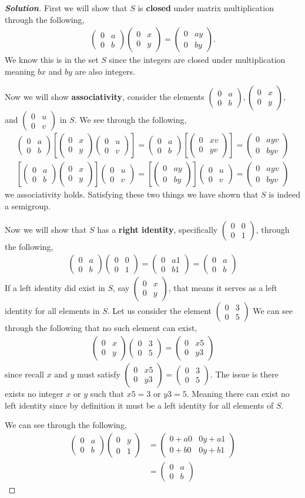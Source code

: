 \documentclass[11pt]{article}
\newenvironment{solution}{\begin{proof}[\textbf{\textit{Solution}}] }{\end{proof}}
\newcommand\m[1]{\begin{pmatrix}#1\end{pmatrix}}
\begin{document}
\begin{solution}
    \newcommand{\pmat}{\m{0 & a \\ 0 & b}}
    \newcommand{\pmats}[2]{\begin{pmatrix}0 & #1 \\ 0 & #2\end{pmatrix}}
    First we will show that $S$ is \textbf{closed} under matrix multiplication through the following,
    \begin{align*}
        \pmat \m{0 & x \\ 0 & y} = \m{0 & ay \\ 0 & by}.
    \end{align*}
    We know this is in the set $S$ since the integers are closed under multiplication meaning $bx$ and $by$ are also integers. 

    Now we will show \textbf{associativity}, consider the elements $\pmats{a}{b}, \pmats{x}{y},$ and $\pmats{u}{v}$ in $S$. We see through the following, 
    \begin{align*}
        \pmats{a}{b} \left[\pmats{x}{y}\pmats{u}{v}\right] = \pmat \left[\pmats{xv}{yv}\right] = \pmats{ayv}{byv} \\
        \left[\pmats{a}{b}\pmats{x}{y}\right] \pmats{u}{v} = \left[\pmats{ay}{by}\right]\pmats{u}{v} = \pmats{ayv}{byv}
    \end{align*}
    we associativity holds. Satisfying these two things we have shown that $S$ is indeed a semigroup. 

    Now we will show that $S$ has a \textbf{right identity}, specifically $\pmats{0}{1}$, through the following,
    \begin{align*}
        \pmat \pmats{0}{1} = \pmats{a1}{b1} = \pmats{a}{b}
    \end{align*}
    If a left identity did exist in $S$, say $\pmats{x}{y}$, that means it serves as a left identity for all elements in $S$. Let us consider the element $\pmats{3}{5}$
    We can see through the following that no such element can exist,
    \begin{align*}
        \pmats{x}{y}\pmats{3}{5} = \pmats{x5}{y3}
    \end{align*}
    since recall $x$ and $y$ must satisfy $\pmats{x5}{y3} = \pmats{3}{5}$. The issue is there exists no integer $x$ or $y$ such that $x5 = 3$ or $y3 =5$. Meaning there can exist no left identity since by definition it must be a left identity for all elements of $S$.
    \newpage
    
    We can see through the following,
    \begin{align*}
        \pmat \m{0 & y \\ 0 & 1} &= \m{0 + a0 & 0y + a1 \\ 0 + b0 & 0y + b1}\\ &= \m{0 & a \\ 0 & b}
    \end{align*}



\end{solution}
\end{document}
